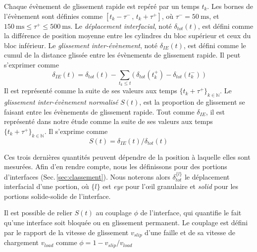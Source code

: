 \begin{itemize}
\bitem Chaque évènement de glissement rapide est repéré par un temps $t_k$. Les bornes de l'évènement sont définies comme $\left[t_k-\tau^-\,,\,t_k+\tau^+\right]$, où $\tau^-=\SI{50}{\milli\second}$, et $\SI{150}{\milli\second}\leq\tau^+\leq\SI{500}{\milli\second}$.
\bitem Le \textit{déplacement interfacial}, noté $\delta_{tot}(t)$, est défini comme la différence de position moyenne entre les cylindres du bloc supérieur et ceux du bloc inférieur.
\bitem Le \textit{glissement inter-évènement}, noté $\delta_{IE}(t)$, est défini comme le cumul de la distance glissée entre les évènements de glissement rapide. Il peut s'exprimer comme
\begin{equation}
\delta_{IE}(t)=\delta_{tot}(t)-\sum_{t_k\leq t}\Big(\:\delta_{tot}(t_k^+)-\delta_{tot}(t_k^-)\:\Big)
\end{equation}
Il est représenté comme la suite de ses valeurs aux temps ${\{t_k+\tau^+\}_{k\in\mathbb{N}}}$.
\bitem Le \textit{glissement inter-évènement normalisé} $S(t)$, est la proportion de glissement se faisant entre les évènements de glissement rapide. Tout comme $\delta_{IE}$, il est représenté dans notre étude comme la suite de ses valeurs aux temps $\{t_k+\tau^+\}_{k\in\mathbb{N}}$. Il s'exprime comme
\begin{equation}
S(t)=\delta_{IE}(t)/\delta_{tot}(t)
\end{equation}
\end{itemize}



Ces trois dernières quantités peuvent dépendre de la position à laquelle elles sont mesurées. Afin d'en rendre compte, nous les définissons pour des portions d'interfaces (Sec.\,\ref{sec:classement}). Nous noterons alors $\delta_{tot}^{\{l\}}$ le déplacement interfacial d'une portion, où $\{l\}$ est \textit{eye} pour l'œil granulaire et \textit{solid} pour les portions solide-solide de l'interface.



Il est possible de relier $S(t)$ au couplage $\phi$ de l'interface, qui quantifie le fait qu'une interface soit bloquée ou en glissement permanent. Le couplage est défini par le rapport de la vitesse de glissement $v_{slip}$ d'une faille et de sa vitesse de chargement $v_{load}$ comme $\phi=1-{v_{slip}}/{v_{load}}$


